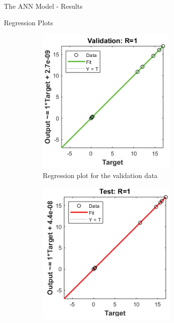 \documentclass{beamer}
\begin{document}
\begin{frame}{The ANN Model - Results}
\begin{block}{Regression Plots}
\begin{figure}
\begin{subfigure}[b]{0.23\textwidth}
             \includegraphics[width=\textwidth]{Figures/Regression-validation.png}
             \caption{\centering Regression plot for the validation data}
         \end{subfigure}
         \hfill
         \begin{subfigure}[b]{0.23\textwidth}
             \centering
             \includegraphics[width=\textwidth]{Figures/Regression-test.png}

\end{subfigure}
\end{figure}
\end{block}
\end{frame}
\end{document}
